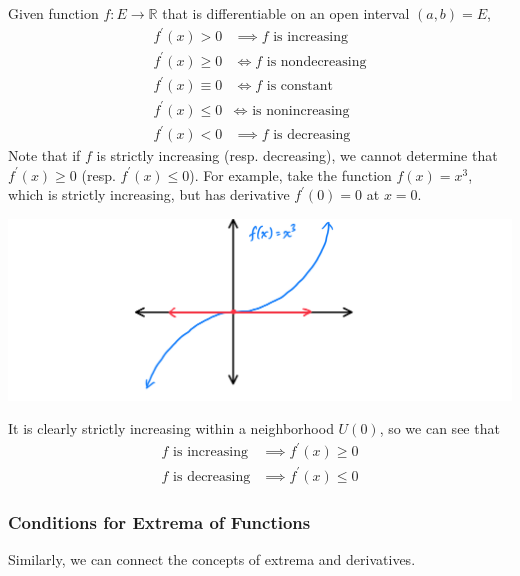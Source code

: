 \documentclass{article}
\begin{document}
    \begin{theorem}
    Given function $f: E \longrightarrow \mathbb{R}$ that is differentiable on an open interval $(a, b) = E$, 
    \begin{align*}
        f^\prime (x) > 0 & \implies f \text{ is increasing} \\
        f^\prime (x) \geq 0 & \iff f \text{ is nondecreasing} \\
        f^\prime (x) \equiv 0 & \iff f \text{ is constant} \\
        f^\prime (x) \leq 0 & \iff \text{ is nonincreasing} \\
        f^\prime (x) < 0 & \implies f \text{ is decreasing} 
    \end{align*}
    Note that if $f$ is strictly increasing (resp. decreasing), we cannot determine that $f^\prime(x) \geq 0$ (resp. $f^\prime (x) \leq 0$). For example, take the function $f(x) = x^3$, which is strictly increasing, but has derivative $f^\prime (0) = 0$ at $x = 0$. 
    \begin{center}
        \includegraphics[scale=0.25]{img/Monotonicity_Counterexample_x3.PNG}
    \end{center}
    It is clearly strictly increasing within a neighborhood $U(0)$, so we can see that
    \begin{align*}
        f \text{ is increasing} & \implies f^\prime (x) \geq 0 \\
        f \text{ is decreasing} & \implies f^\prime (x) \leq 0
    \end{align*}
    \end{theorem}


    \subsubsection{Conditions for Extrema of Functions}
    Similarly, we can connect the concepts of extrema and derivatives. 
\end{document}
